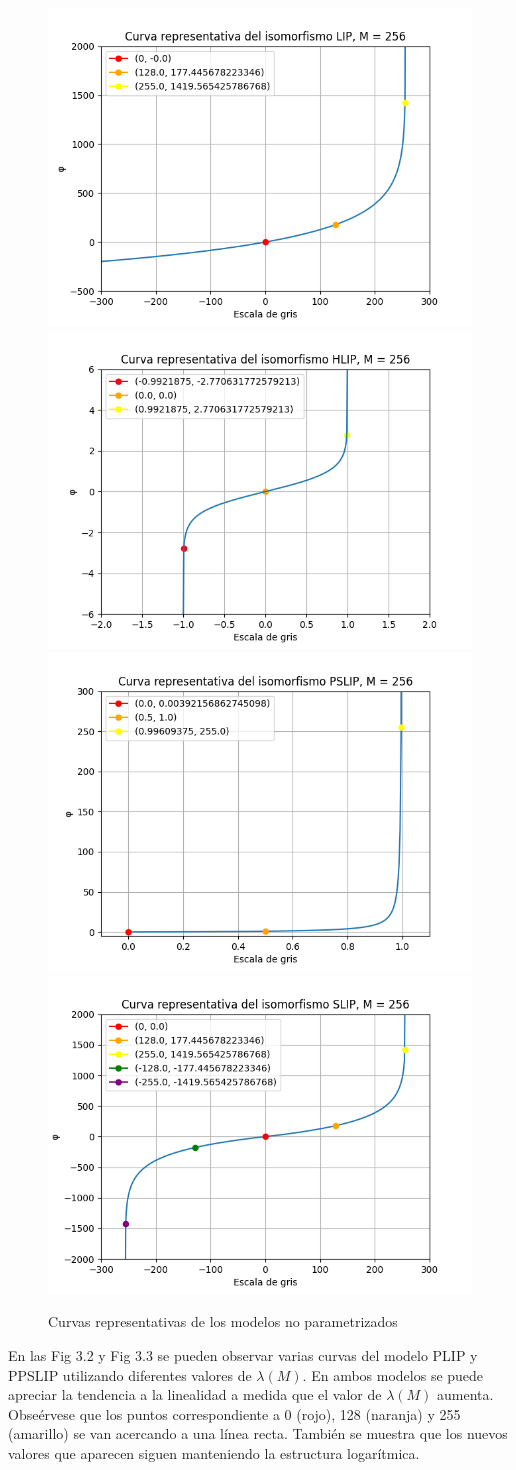 \begin{figure}
	\begin{center}
		\includegraphics[width=5.5 cm]{images/clasics_curves/lip_curve.png}
		\includegraphics[width=5.5 cm]{images/clasics_curves/hlip_curve.png}
		\includegraphics[width=5.5 cm]{images/clasics_curves/pslip_curve.png}
		\includegraphics[width=5.5 cm]{images/clasics_curves/slip_curve.png}
		\caption{Curvas representativas de los modelos no parametrizados}
	\end{center}
\end{figure}

En las Fig 3.2 y Fig 3.3 se pueden observar varias curvas del modelo PLIP y PPSLIP utilizando diferentes valores de $\lambda(M)$. En ambos modelos se puede apreciar la tendencia a la linealidad a medida que el valor de $\lambda(M)$ aumenta. Obse\'ervese que los puntos correspondiente a 0 (rojo), 128 (naranja) y 255 (amarillo) se van acercando a una l\'inea recta. Tambi\'en se muestra que los nuevos valores que aparecen siguen manteniendo la estructura logar\'itmica.

